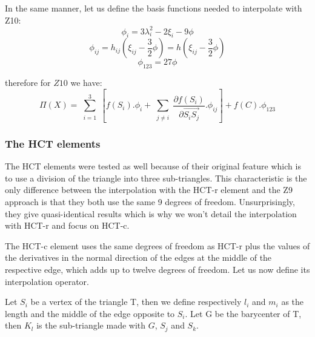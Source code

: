 \documentclass[proc]{edpsmath}
\begin{document}
\noindent In the same manner, let us define the basis functions needed to interpolate with Z10: 
\begin{equation*}
\phi_i = 3\lambda_{i}^2 -2 \xi_i - 9 \phi
\end{equation*}
\begin{equation*}
\phi_{ij} = h_{ij} (\xi_{ij} -\frac{3}{2}\phi)=h (\xi_{ij} -\frac{3}{2}\phi)
\end{equation*}
\begin{equation*}
\phi_{123}=27\phi
\end{equation*}

\noindent therefore for $Z10$ we have:
\begin{equation*}
 \Pi (X) = \sum \limits_{\substack{i=1 }}^{3}{ [f(S_i).\phi_i + \sum \limits_{\substack{j\neq i }}^{}{ \frac{\partial f(S_i)}{\partial  \overrightarrow{ S_i S_j } }.\phi_{ij} } ] } + f(C).\phi_{123}
\end{equation*}

\subsubsection{The HCT elements}
The HCT elements were tested as well because of their original feature which is to use a division of the triangle into three sub-triangles.
This characteristic is the only difference between the interpolation with the HCT-r element and the  Z9 approach is that they both use the same 9 degrees of freedom. Unsurprisingly, they give quasi-identical results which is why we won't detail the interpolation with HCT-r and focus on HCT-c.

The HCT-c  element uses the same degrees of freedom as HCT-r plus the values of the derivatives in the normal direction of the edges at the middle of the respective edge, which adds up to twelve degrees of freedom. Let us now define its interpolation operator.

Let $S_i$ be a vertex of the triangle T, then we define respectively $l_i$ and $m_i$ as the length and the middle of the edge opposite to $S_i$. Let G be the barycenter of T, then $K_l$ is the sub-triangle made with $G$, $S_j$ and $S_k$.

\end{document}
